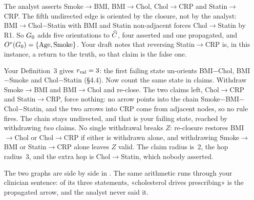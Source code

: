 \begin{exemplo}
The analyst asserts Smoke$\to$BMI, BMI$\to$Chol, Chol$\to$CRP and Statin$\to$CRP. The fifth undirected
edge is oriented by the closure, not by the analyst: BMI$\to$Chol$-$Statin with BMI and Statin
non-adjacent forces Chol$\to$Statin by R1. So $G_0$ adds five orientations to $\widehat{C}$, four asserted and
one propagated, and $O^{*}(G_0) = \{\text{Age}, \text{Smoke}\}$. Your draft notes that reversing
Statin$\to$CRP is, in this instance, a return to the truth, so that claim is the false one.

Your Definition~3 gives $r_{\mathrm{val}} = 3$: the first failing state un-orients BMI$-$Chol, BMI$-$Smoke and
Chol$-$Statin (\S4.4). Now count the same state in claims. Withdraw Smoke$\to$BMI and BMI$\to$Chol and
re-close. The two claims left, Chol$\to$CRP and Statin$\to$CRP, force nothing: no arrow points into the
chain Smoke$-$BMI$-$Chol$-$Statin, and the two arrows into CRP come from adjacent nodes, so no rule
fires. The chain stays undirected, and that is your failing state, reached by withdrawing \emph{two}
claims. No single withdrawal breaks $Z$: re-closure restores BMI$\to$Chol or Chol$\to$CRP if
either is withdrawn alone, and withdrawing Smoke$\to$BMI or Statin$\to$CRP alone leaves $Z$ valid. The
claim radius is~2, the hop radius~3, and the extra hop is Chol$\to$Statin, which nobody asserted.
\end{exemplo}

The two graphs are side by side in . The same arithmetic runs through your
clinician sentence: of its three statements, «cholesterol drives prescribing» is the propagated arrow,
and the analyst never said it.

